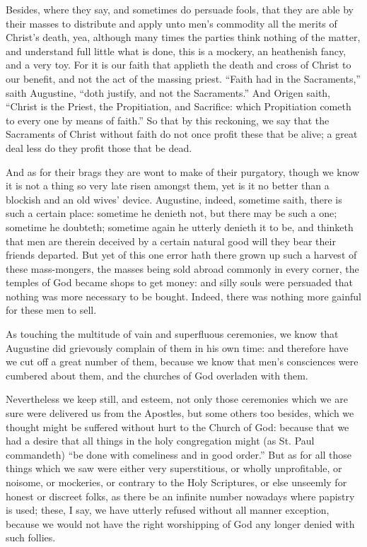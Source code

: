 Besides, where they say, and sometimes do persuade fools, that they
are able by their masses to distribute and apply unto men’s commodity
all the merits of Christ’s death, yea, although many times the
parties think nothing of the matter, and understand full little what
is done, this is a mockery, an heathenish fancy, and a very toy.
For it is our faith that applieth the death and cross of Christ to our
benefit, and not the act of the massing priest. “Faith had
in the Sacraments,” saith Augustine, “doth justify, and
not the Sacraments.” And Origen saith, “Christ is
the Priest, the Propitiation, and
Sacrifice: which Propitiation cometh to every one by means of faith.”
So that by this reckoning, we say that the Sacraments of Christ without
faith do not once profit these that be alive; a great deal less do they
profit those that be dead.

And as for their brags they are wont to make of their purgatory,
though we know it is not a thing so very late risen amongst them, yet
is it no better than a blockish and an old wives’ device.
Augustine, indeed, sometime saith, there is such a certain place: sometime
he denieth not, but there may be such a one; sometime he doubteth; sometime
again he utterly denieth it to be, and thinketh that men are therein
deceived by a certain natural good will they bear their friends departed.
But yet of this one error hath there grown up such a harvest of these
mass-mongers, the masses being sold abroad commonly in every corner,
the temples of God became shops to get money: and silly souls were persuaded
that nothing was more necessary to be bought. Indeed, there was
nothing more gainful for these men to sell.

As touching the multitude of vain and superfluous ceremonies, we
know that Augustine did grievously complain of them in his own time:
and therefore have we cut off a great number of them, because
we know that men’s consciences were cumbered about them, and the
churches of God overladen with them.

Nevertheless we keep still, and esteem, not only those ceremonies
which we are sure were delivered us from the Apostles, but some others
too besides, which we thought might be suffered without hurt to the
Church of God: because that we had a desire that all things in the holy
congregation might (as St. Paul commandeth) “be done with comeliness
and in good order.” But as for all those things which we
saw were either very superstitious, or wholly unprofitable, or noisome,
or mockeries, or contrary to the Holy Scriptures, or else unseemly for
honest or discreet folks, as there be an infinite number nowadays where
papistry is used; these, I say, we have utterly refused without all
manner exception, because we would not have the right worshipping of
God any longer denied with such follies.

